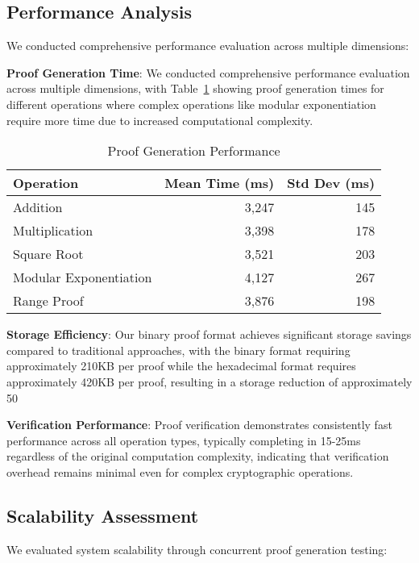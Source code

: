 \documentclass[11pt]{article}
\begin{document}
\subsection{Performance Analysis}

We conducted comprehensive performance evaluation across multiple dimensions:

\textbf{Proof Generation Time}: We conducted comprehensive performance evaluation across multiple dimensions, with Table~\ref{tab:performance} showing proof generation times for different operations where complex operations like modular exponentiation require more time due to increased computational complexity.

\begin{table}[ht]
\centering
\caption{Proof Generation Performance}
\label{tab:performance}
\begin{tabular}{lrr}
\toprule
Operation & Mean Time (ms) & Std Dev (ms) \\
\midrule
Addition & 3,247 & 145 \\
Multiplication & 3,398 & 178 \\
Square Root & 3,521 & 203 \\
Modular Exponentiation & 4,127 & 267 \\
Range Proof & 3,876 & 198 \\
\bottomrule
\end{tabular}
\end{table}

\textbf{Storage Efficiency}: Our binary proof format achieves significant storage savings compared to traditional approaches, with the binary format requiring approximately 210KB per proof while the hexadecimal format requires approximately 420KB per proof, resulting in a storage reduction of approximately 50%

\textbf{Verification Performance}: Proof verification demonstrates consistently fast performance across all operation types, typically completing in 15-25ms regardless of the original computation complexity, indicating that verification overhead remains minimal even for complex cryptographic operations.

\subsection{Scalability Assessment}

We evaluated system scalability through concurrent proof generation testing:
\end{document}

